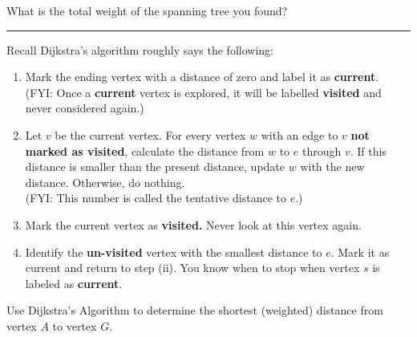 \documentclass[12pt]{article}
\renewcommand{\emph}[1]{\textsf{\textbf{#1}}}
\newcommand{\ans}[1][1in]{\rule{#1}{.5pt}}
\begin{document}
  \bigskip

  \bigskip


  What is the total weight of the spanning tree you found? \ans
	
  \vfill

  \newpage

  
\item Recall Dijkstra's algorithm roughly says the following:
  

\begin{enumerate}[label=(\roman*)]
	\item  Mark the ending vertex with a distance of zero and label it as \emph{current}.\\
	(FYI: Once a \emph{current} vertex is explored, it will be labelled \emph{visited} and never considered again.)
	\item  Let $v$ be the current vertex. For every vertex $w$ with an edge to $v$ \emph{not marked as \textbf{visited}}, calculate the distance from $w$ to $e$ through $v.$ If this distance is smaller than the present distance, update $w$ with the new distance. Otherwise, do nothing. \\
	(FYI: This number is called the tentative distance to $e$.)
	\item Mark the current vertex as \emph{visited.} Never look at this vertex again.
	\item Identify the \emph{un-visited} vertex with the smallest distance to $e$. Mark it as current and return to step (ii). You know when to stop when vertex $s$ is labeled as \textbf{current}.
\end{enumerate}

  Use Dijkstra's Algorithm to determine the shortest (weighted)
  distance from vertex $A$ to vertex $G$.
\end{document}

